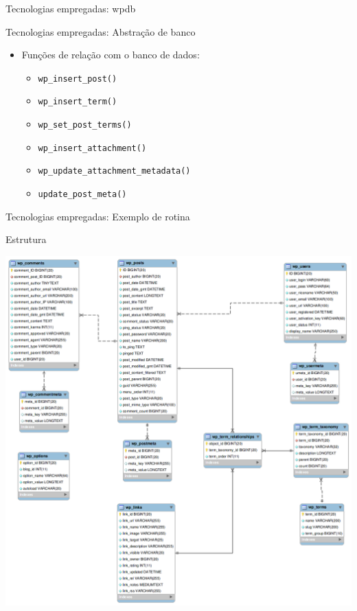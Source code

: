 \documentclass[handout]{beamer}
\begin{document}
\begin{frame}{Tecnologias empregadas: wpdb}
  
\end{frame}

\begin{frame}{Tecnologias empregadas: Abstração de banco}
    \begin{itemize}
    \pause \item Funções de relação com o banco de dados:
    \begin{itemize}
      \pause \item \texttt{wp\_insert\_post()}
      \pause \item \texttt{wp\_insert\_term()}
      \pause \item \texttt{wp\_set\_post\_terms()}
      \pause \item \texttt{wp\_insert\_attachment()}
      \pause \item \texttt{wp\_update\_attachment\_metadata()}
      \pause \item \texttt{update\_post\_meta()}
    \end{itemize}
  \end{itemize}
\end{frame}

\begin{frame}{Tecnologias empregadas: Exemplo de rotina}
  
\end{frame}

\begin{frame}{Estrutura}
  \begin{center}
    \pause \includegraphics[height=0.8\textheight,natwidth=1079,natheight=1089]{./img/wp-tables.png}
  \end{center}
\end{frame}
\end{document}
